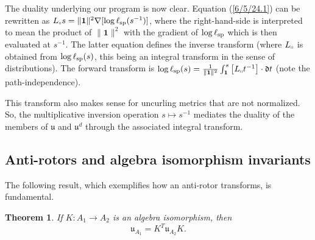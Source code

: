 \documentclass{amsart}
\numberwithin{equation}{section}
\newtheorem{theorem}{Theorem}
\theoremstyle{definition}
\numberwithin{theorem}{section}
\begin{document}
The duality underlying our program is now clear.  Equation (\ref{6/5/24.1}) can be rewritten as  $L_{\shortparallel}s = \|\mathbf{1}\|^2 \nabla[\log \ell_{\rm sp}(s^{-1})]$, where the right-hand-side is interpreted to mean the product of $\|\mathbf{1}\|^2$ with the gradient of $\log \ell_{\rm sp}$ which is then evaluated at $s^{-1}$.  The latter equation defines the inverse transform (where $L_{\shortparallel}$ is obtained from $\log\ell_{\rm sp}(s)$, this being an integral transform in the sense of distributions).  The forward transform is $\log\ell_{\rm sp}(s) = \frac{1}{\|\mathbf{1}\|^2}\int_{{\bf 1}}^{s} \left[L_{\shortparallel} t^{-1}\right]\cdot \mathfrak{d}t$ (note the path-independence).    

This transform also makes sense for uncurling metrics that are not normalized. So, the multiplicative inversion operation $s\mapsto s^{-1}$ mediates the duality of the members of $\mathfrak{u}$ and $\mathfrak{u}^d$ through the associated integral transform.

\subsection{Anti-rotors and algebra isomorphism invariants} The following result, which exemplifies how an anti-rotor transforms, is fundamental.

\begin{theorem} \label{6/6/23.1} If $K:A_1\rightarrow A_2$ is an algebra isomorphism, then \begin{equation}\label{5/23/23.1} \mathfrak{u}_{A_1} = K^T \mathfrak{u}_{A_2} K. \end{equation} \end{theorem}
\end{document}
